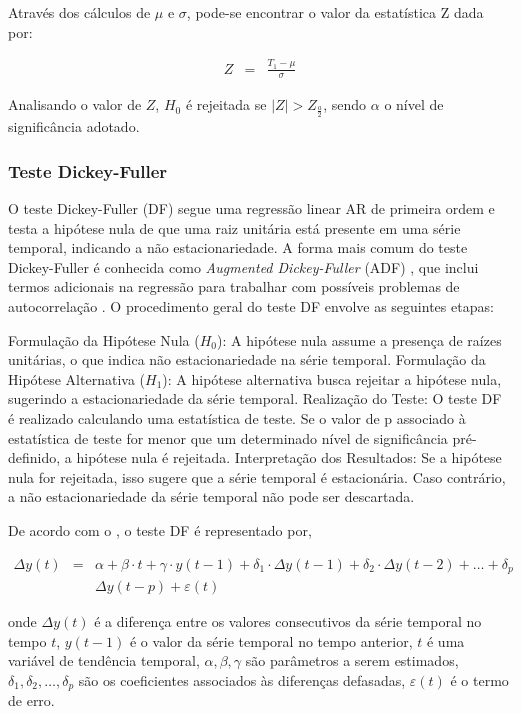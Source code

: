 Através dos cálculos de $\mu$ e $\sigma$, pode-se encontrar o valor da estatística $\mathrm{Z}$ dada por:

\begin{eqnarray}
	Z&=&\frac{T_1-\mu}{\sigma}
\end{eqnarray}


Analisando o valor de $Z$, $H_0$ é rejeitada se $|Z|>Z_{\frac{a}{2}}$, sendo $\alpha$ o nível de significância adotado.



\subsubsection{Teste Dickey-Fuller}

O teste Dickey-Fuller (DF) segue uma regressão linear AR de primeira ordem e testa a hipótese nula de que uma raiz unitária está presente em uma série temporal, indicando a não estacionariedade. A forma mais comum do teste Dickey-Fuller é conhecida como \textit{Augmented Dickey-Fuller} (ADF) , que inclui termos adicionais na regressão para trabalhar com possíveis problemas de autocorrelação
 \cite{Agiakloglou}. O procedimento geral do teste DF envolve as seguintes etapas:

Formulação da Hipótese Nula ($H_0$): A hipótese nula assume a presença de raízes unitárias, o que indica não estacionariedade na série temporal.
Formulação da Hipótese Alternativa ($H_1$): A hipótese alternativa busca rejeitar a hipótese nula, sugerindo a estacionariedade da série temporal.
Realização do Teste: O teste DF é realizado calculando uma estatística de teste. Se o valor de p associado à estatística de teste for menor que um determinado nível de significância pré-definido, a hipótese nula é rejeitada.
Interpretação dos Resultados: Se a hipótese nula for rejeitada, isso sugere que a série temporal é estacionária. Caso contrário, a não estacionariedade da série temporal não pode ser descartada.

De acordo com o , o teste DF é representado por,



\begin{eqnarray}
	 \Delta y(t)&=&\alpha+\beta \cdot t+\gamma \cdot y(t-1)+\delta_1 \cdot \Delta y(t-1)+\delta_2 \cdot \Delta y(t-2)+\ldots+\delta_p \nonumber\\ 
	&&\Delta y(t-p)+\varepsilon(t)
\end{eqnarray}

\noindent onde $\Delta y(t)$ é a diferença entre os valores consecutivos da série temporal no tempo $t$, $y(t-1)$ é o valor da série temporal no tempo anterior, $t$ é uma variável de tendência temporal, $\alpha, \beta, \gamma$ são parâmetros a serem estimados, $\delta_1, \delta_2, \ldots, \delta_p$ são os coeficientes associados às diferenças defasadas, $\varepsilon(t)$ é o termo de erro.
 
